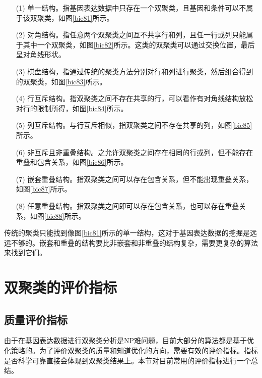   \begin{enumerate}
    \item[(1)] 单一结构。指基因表达数据中只存在一个双聚类，且基因和条件可以不属于该双聚类，如图\ref{bic81}所示。
    \item[(2)] 对角结构。指任意两个双聚类之间互不共享行和列，且任一行或列只能属于其中一个双聚类，如图\ref{bic82}所示。这类的双聚类可以通过交换位置，最后呈对角线形状。
    \item[(3)] 棋盘结构，指通过传统的聚类方法分别对行和列进行聚类，然后组合得到的双聚类，如图\ref{bic83}所示。
    \item[(4)] 行互斥结构。指双聚类之间不存在共享的行，可以看作有对角线结构放松对行的限制所得，如图\ref{bic84}所示。
    \item[(5)] 列互斥结构。与行互斥相似，指双聚类之间不存在共享的列，如图\ref{bic85}所示。
    \item[(6)] 非互斥且非重叠结构。之允许双聚类之间存在相同的行或列，但不能存在重叠和包含关系，如图\ref{bic86}所示。
    \item[(7)] 嵌套重叠结构。指双聚类之间可以存在包含关系，但不能出现重叠关系，如图\ref{bic87}所示。
    \item[(8)] 任意重叠结构。指双聚类之间即可以存在包含关系，也可以存在重叠关系，如图\ref{bic88}所示。
  \end{enumerate}

  传统的聚类只能找到像图\ref{bic81}所示的单一结构，这对于基因表达数据的挖掘是远远不够的。嵌套和重叠的结构要比非嵌套和非重叠的结构复杂，需要更复杂的算法来找到它们。

  
\section{双聚类的评价指标}
  \subsection{质量评价指标}
  由于在基因表达数据进行双聚类分析是NP难问题，目前大部分的算法都是基于优化策略的。为了评价双聚类的质量和知道优化的方向，需要有效的评价指标。指标是否科学可靠直接会体现到双聚类结果上。本节对目前常用的评价指标进行一个总结。
  
